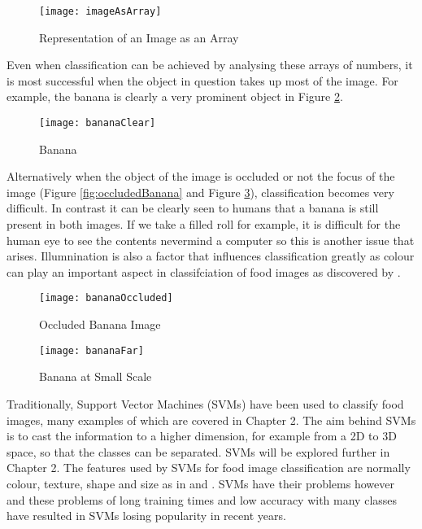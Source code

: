 \begin{figure}[h]
	\centering
	\texttt{[image: imageAsArray]}
	\caption{Representation of an Image as an Array}
	\label{fig:imageArray}
\end{figure}

Even when classification can be achieved by analysing these arrays of numbers, it is most successful when the object in question takes up most of the image.
For example, the banana is clearly a very prominent object in Figure \ref{fig:bananaClear}.

\begin{figure}[h]
	\texttt{[image: bananaClear]}
	\caption{Banana}
	\label{fig:bananaClear}
\end{figure}

Alternatively when the object of the image is occluded or not the focus of the image (Figure \ref{fig:occludedBanana} and Figure \ref{fig:farBanana}), classification becomes very difficult.
In contrast it can be clearly seen to humans that a banana is still present in both images.
If we take a filled roll for example, it is difficult for the human eye to see the contents nevermind a computer so this is another issue that arises.
Illumnination is also a factor that influences classification greatly as colour can play an important aspect in classifciation of food images as discovered by \textcite{novelSVM}.

\begin{figure}[h] 
  \label{ fig7} 
  \begin{minipage}[h]{0.5\linewidth}
    \centering
    \texttt{[image: bananaOccluded]} 
    \caption{Occluded Banana Image} 
  \label{fig:occludedBanana}
    \vspace{4ex}
  \end{minipage}%
  \begin{minipage}[h]{0.5\linewidth}
    \centering
    \texttt{[image: bananaFar]} 
    \caption{Banana at Small Scale} 
  \label{fig:farBanana}
    \vspace{4ex}
  \end{minipage} 
\end{figure}

Traditionally, Support Vector Machines (SVMs) have been used to classify food images, many examples of which are covered in Chapter 2.
The aim behind SVMs is to cast the information to a higher dimension, for
example from a 2D to 3D space, so that the classes can be separated. SVMs will be explored further in Chapter 2.
The features used by SVMs for food image classification are normally colour, texture, shape and size as in \textcite{pouladzadeh2014measuring} and \textcite{novelSVM}.
SVMs have their problems however and these problems of long training times and low accuracy with many classes have resulted in SVMs losing popularity in recent years.

